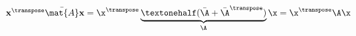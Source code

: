 \documentclass[12pt]{article}
\begin{document}
  
$
\mathbf{x}^\transpose \bar{\mat{A}} \mathbf{x} = 
\x^\transpose 
\underbrace{½ (\bar{\A} + \bar{\A}^\transpose)}_{\A}
\x = 
\x^\transpose \A \x

$
\end{document}
